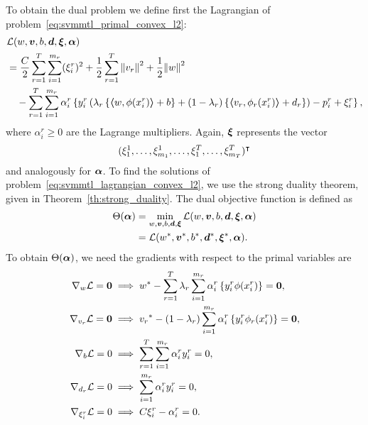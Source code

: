  To obtain the dual problem we define first the Lagrangian of problem~\eqref{eq:svmmtl_primal_convex_l2}:
\begin{equation}\label{eq:svmmtl_lagrangian_convex_l2}
    \begin{aligned}
        & \lagr({w}, \fv{v}, b, \fv{d}, \fv{\xi}, \fv{\alpha}) \\
        &=  \frac{C}{2} \sum_{r= 1}^T \sum_{i=1}^{m_r} ({\xi_{i}^r})^2 + \frac{1}{2} \sum_{r= 1}^T{\norm{{v}_r}^2} + \frac{1}{2} {\norm{{w}}}^2 \\
        &\quad -  \sum_{r= 1}^T \sum_{i=1}^{m_r} \alpha_i^r \left\lbrace y_{i}^r  \left(\lambda_r \left\lbrace \dotp{w}{\phi(x_{i}^r)} + b  \right\rbrace + (1 - \lambda_r) \left\lbrace \dotp{{v}_r}{\phi_r(x_{i}^r)} + d_r \right\rbrace  \right) - p_{i}^r + \xi_{i}^r  \right\rbrace ,
    \end{aligned}
\end{equation}
where $\alpha_i^r \geq 0$ are the Lagrange multipliers. 
Again, $\bm{\xi}$ represents the vector $$(\xi_1^1, \ldots, \xi_{m_1}^1, \ldots, \xi_1^T, \ldots, \xi_{m_T}^T)^\intercal$$ and analogously for $\bm{\alpha}$. 
To find the solutions of problem~\eqref{eq:svmmtl_lagrangian_convex_l2}, we use the strong duality theorem, given in Theorem~\ref{th:strong_duality}. The dual objective function is defined as 
\begin{equation}\nonumber
    \begin{aligned}
         \Theta(\bm{\alpha}) &=  \min_{{w}, \bm{v}, b, \bm{d}, \bm{\xi}} \mathcal{L}({w}, \bm{v}, b, \bm{d}, \bm{\xi}, \bm{\alpha}) \\
         &= \mathcal{L}({{w}}^*, {\bm{v}}^*, {b}^*, {\bm{d}}^*, {\bm{\xi}}^*, \bm{\alpha}) .
    \end{aligned}    
\end{equation}
To obtain $\Theta(\bm{\alpha})$, we need the gradients with respect to the primal variables are
\begin{align}
    \grad_{{w}} \lagr = \fv{0}  &\implies \optim{{w}} - \sum_{r= 1}^\ntasks \lambda_r \sum_{i=1}^{m_r} {\alpha_i^r} \left\lbrace y_i^r \phi(x_i^r) \right\rbrace = \fv{0} , \label{eq:common_repr_conv_l2} \\
    \grad_{{v}_r} \lagr = \fv{0} &\implies \optim{{v}_r} - (1 - \lambda_r) \sum_{i=1}^{m_r} {\alpha_i^r} \left\lbrace y_i^r \phi_r(x_i^r) \right\rbrace = \fv{0} , \label{eq:specific_repr_conv_l2} \\
    \grad_{b} \lagr = 0  &\implies \sum_{r= 1}^T \sum_{i=1}^{m_r} {\alpha_i^r} y_i^r = 0 , \label{eq:specific_eqconstr_conv_l2}  \\
    \grad_{{d}_r} \lagr = 0 &\implies \sum_{i=1}^{m_r} {\alpha_i^r} y_i^r = 0 , \label{eq:common_eqconstr_conv_l2} \\
    \grad_{\xi_i^r} \lagr = 0 &\implies C \xi_i^r - {\alpha_i^r} = 0 . \label{eq:xi_feas_conv_l2}
\end{align}
